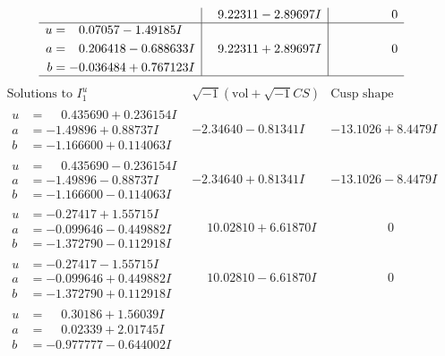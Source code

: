 \documentclass[1p]{elsarticle_modified}
\theoremstyle{definition}
\newcommand{\I}{\sqrt{-1}}
\begin{document}
$$\begin{array}{c|c|c}
 & \phantom{-}9.22311 - 2.89697 I & \phantom{-0.000000 } 0 \\ \hline\begin{aligned}
u &= \phantom{-}0.07057 - 1.49185 I \\
a &= \phantom{-}0.206418 - 0.688633 I \\
b &= -0.036484 + 0.767123 I\end{aligned}
 & \phantom{-}9.22311 + 2.89697 I & \phantom{-0.000000 } 0\\
 \hline 
 \end{array}$$\newpage$$\begin{array}{c|c|c}  
\text{Solutions to }I^u_{1}& \I (\text{vol} + \sqrt{-1}CS) & \text{Cusp shape}\\
 \hline 
\begin{aligned}
u &= \phantom{-}0.435690 + 0.236154 I \\
a &= -1.49896 + 0.88737 I \\
b &= -1.166600 + 0.114063 I\end{aligned}
 & -2.34640 - 0.81341 I & -13.1026 + 8.4479 I \\ \hline\begin{aligned}
u &= \phantom{-}0.435690 - 0.236154 I \\
a &= -1.49896 - 0.88737 I \\
b &= -1.166600 - 0.114063 I\end{aligned}
 & -2.34640 + 0.81341 I & -13.1026 - 8.4479 I \\ \hline\begin{aligned}
u &= -0.27417 + 1.55715 I \\
a &= -0.099646 - 0.449882 I \\
b &= -1.372790 - 0.112918 I\end{aligned}
 & \phantom{-}10.02810 + 6.61870 I & \phantom{-0.000000 } 0 \\ \hline\begin{aligned}
u &= -0.27417 - 1.55715 I \\
a &= -0.099646 + 0.449882 I \\
b &= -1.372790 + 0.112918 I\end{aligned}
 & \phantom{-}10.02810 - 6.61870 I & \phantom{-0.000000 } 0 \\ \hline\begin{aligned}
u &= \phantom{-}0.30186 + 1.56039 I \\
a &= \phantom{-}0.02339 + 2.01745 I \\
b &= -0.977777 - 0.644002 I\end{aligned}

\end{array}$$
\end{document}
